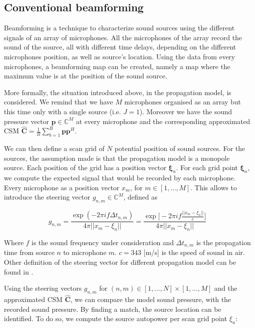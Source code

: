 \documentclass[11pt,a4paper,twoside]{report}
\begin{document}
\subsection{Conventional beamforming}

Beamforming is a technique to characterize sound sources using the different signals of an array of microphones. All the microphones of the array record the sound of the source, all with different time delays, depending on the different microphones position, as well as source's location. Using the data from every microphones, a beamforming map can be created, namely a map where the maximum value is at the position of the sound source.

More formally, the situation introduced above, in the propagation model, is considered. We remind that we have $M$ microphones organised as an array but this time only with a single source (i.e. $J = 1$). Moreover we have the sound pressure vector $\mathbf{p} \in \mathbb{C}^M$ at every microphone and the corresponding approximated CSM $\hat{\mathbf{C}} = \frac{1}{B} \sum_{b = 1}^{B} \mathbf{p}\mathbf{p}^H$.

We can then define a scan grid of $N$ potential position of sound sources. For the sources, the assumption made is that the propagation model is a monopole source. Each position of the grid has a position vector $\mathbf{\xi}_n$. For each grid point $\mathbf{\xi}_n$, we compute the expected signal that would be recorded by each microphone. Every microphone as a position vector $x_m$, for $m \in [1, \dots, M]$. This allows to introduce the  steering vector $g_{n,m} \in \mathbb{C}^M$, defined as 

\begin{equation}
    g_{n,m} = \frac{\exp(-2 \pi i f \Delta t_{n,m})}{4\pi ||x_m -\xi_n||}
    = \frac{\exp \biggl[ -2 \pi i f \frac{||x_m -\xi_n||}{c} \biggr] }{4\pi ||x_m -\xi_n||}  
\end{equation}


Where $f$ is the sound frequency under consideration and $\Delta t_{n,m}$ is the propagation time from source $n$ to microphone $m$. $c = 343$ [m/s] is the speed of sound in air. Other definition of the steering vector for different propagation model can be found in \cite{sarradj2012three}.

Using the steering vectors $g_{n,m}$ for $(n,m) \in [1, \dots, N] \times [1, \dots, M]$ and the approximated CSM $\hat{\mathbf{C}}$, we can compare the model sound pressure, with the recorded sound pressure. By finding a match, the source location can be identified. To do so, we compute the source autopower per scan grid point $\xi_n$:
\end{document}
